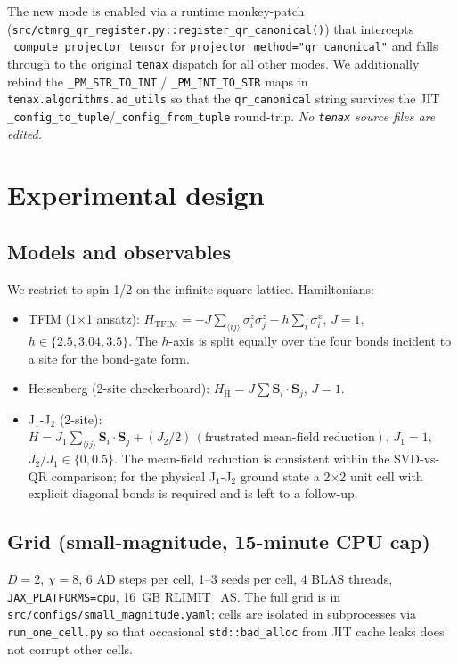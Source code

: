 \documentclass[aps,prresearch,reprint,amsmath,amssymb,floatfix]{revtex4-2}
\newcommand{\tenax}{\texttt{tenax}}
\newcommand{\code}[1]{\texttt{#1}}
\begin{document}
The new mode is enabled via a runtime monkey-patch
(\code{src/ctmrg\_qr\_register.py::register\_qr\_canonical()}) that
intercepts \code{\_compute\_projector\_tensor} for
\code{projector\_method="qr\_canonical"} and falls through to the original
\tenax{} dispatch for all other modes. We additionally rebind the
\code{\_PM\_STR\_TO\_INT} / \code{\_PM\_INT\_TO\_STR} maps in
\code{tenax.algorithms.ad\_utils} so that the \code{qr\_canonical} string
survives the JIT \code{\_config\_to\_tuple}/\code{\_config\_from\_tuple}
round-trip. \emph{No \tenax{} source files are edited.}

\section{Experimental design}

\subsection{Models and observables}

We restrict to spin-1/2 on the infinite square lattice. Hamiltonians:
\begin{itemize}
  \item TFIM (1$\times$1 ansatz): $H_{\mathrm{TFIM}} = -J\sum_{\langle ij\rangle}\sigma^z_i\sigma^z_j - h\sum_i \sigma^x_i$, $J=1$, $h\in\{2.5, 3.04, 3.5\}$. The $h$-axis is split equally over the four bonds incident to a site for the bond-gate form.
  \item Heisenberg (2-site checkerboard): $H_{\mathrm{H}} = J\sum \mathbf{S}_i\cdot\mathbf{S}_j$, $J=1$.
  \item J$_1$-J$_2$ (2-site): $H = J_1\sum_{\langle ij\rangle}\mathbf{S}_i\cdot\mathbf{S}_j + (J_2/2)\,(\text{frustrated mean-field reduction})$, $J_1=1$, $J_2/J_1\in\{0,0.5\}$. The mean-field reduction is consistent within the SVD-vs-QR comparison; for the physical J$_1$-J$_2$ ground state a 2$\times$2 unit cell with explicit diagonal bonds is required and is left to a follow-up.
\end{itemize}

\subsection{Grid (small-magnitude, 15-minute CPU cap)}

$D=2$, $\chi=8$, 6 AD steps per cell, 1--3 seeds per cell, 4 BLAS threads,
\code{JAX\_PLATFORMS=cpu}, 16~GB RLIMIT\_AS. The full grid is in
\code{src/configs/small\_magnitude.yaml}; cells are isolated in
subprocesses via \code{run\_one\_cell.py} so that occasional
\code{std::bad\_alloc} from JIT cache leaks does not corrupt other cells.
\end{document}
